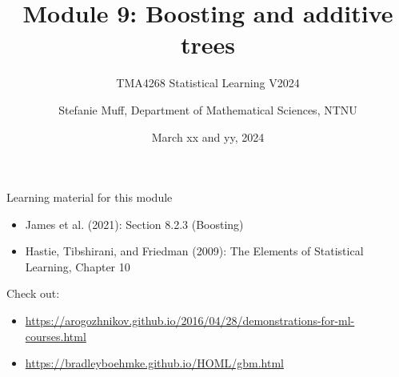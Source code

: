 \documentclass[
  10pt,
  ignorenonframetext,
]{beamer}
\title{Module 9: Boosting and additive trees}
\subtitle{TMA4268 Statistical Learning V2024}
\author{Stefanie Muff, Department of Mathematical Sciences, NTNU}
\date{March xx and yy, 2024}
\providecommand{\tightlist}{%
  \setlength{\itemsep}{0pt}\setlength{\parskip}{0pt}}
\begin{document}
\frame{\titlepage}

\begin{frame}
\begin{block}{Learning material for this module}
\protect\hypertarget{learning-material-for-this-module}{}
\(~\)

\begin{itemize}
\tightlist
\item
  James et al. (2021): Section 8.2.3 (Boosting)
\end{itemize}

\vspace{2mm}

\begin{itemize}
\tightlist
\item
  Hastie, Tibshirani, and Friedman (2009): The Elements of Statistical
  Learning, Chapter 10
\end{itemize}

\vspace{2mm}

Check out:

\begin{itemize}
\item
  \url{https://arogozhnikov.github.io/2016/04/28/demonstrations-for-ml-courses.html}
\item
  \url{https://bradleyboehmke.github.io/HOML/gbm.html}
\end{itemize}
\end{block}
\end{frame}
\end{document}
